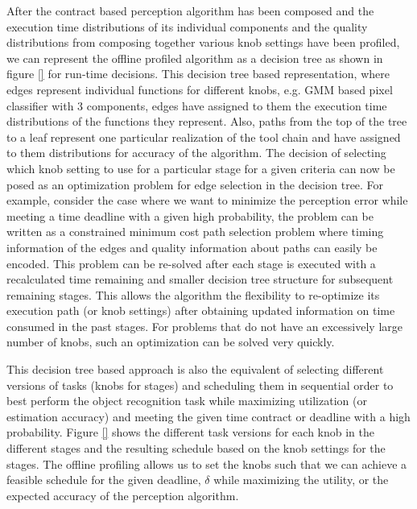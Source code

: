 After the contract based perception algorithm has been composed and the execution time distributions of its individual components and the quality distributions from composing together various knob settings have been profiled, we can represent the offline profiled algorithm as a decision tree as shown in figure \ref{} for run-time decisions. This decision tree based representation, where edges represent individual functions for different knobs, e.g. GMM based pixel classifier with 3 components, edges have assigned to them the execution time distributions of the functions they represent. Also, paths from the top of the tree to a leaf represent one particular realization of the tool chain and have assigned to them distributions for accuracy of the algorithm. The decision of selecting which knob setting to use for a particular stage for a given criteria can now be posed as an optimization problem for edge selection in the decision tree. For example, consider the case where we want to minimize the perception error while meeting a time deadline with a given high probability, the problem can be written as a constrained minimum cost path selection problem where timing information of the edges and quality information about paths can easily be encoded. This problem can be re-solved after each stage is executed with a recalculated time remaining and smaller decision tree structure for subsequent remaining stages. This allows the algorithm the flexibility to re-optimize its execution path (or knob settings) after obtaining updated information on time consumed in the past stages. For problems that do not have an excessively large number of knobs, such an optimization can be solved very quickly.

This decision tree based approach is also the equivalent of selecting different versions of tasks (knobs for stages) and scheduling them in sequential order to best perform the object recognition task while maximizing utilization (or estimation accuracy) and meeting the given time contract or deadline with a high probability. Figure \ref{} shows the different task versions for each knob in the different stages and the resulting schedule based on the knob settings for the stages. The offline profiling allows us to set the knobs such that we can achieve a feasible schedule for the given deadline, $\delta$ while maximizing the utility, or the expected accuracy of the perception algorithm.


